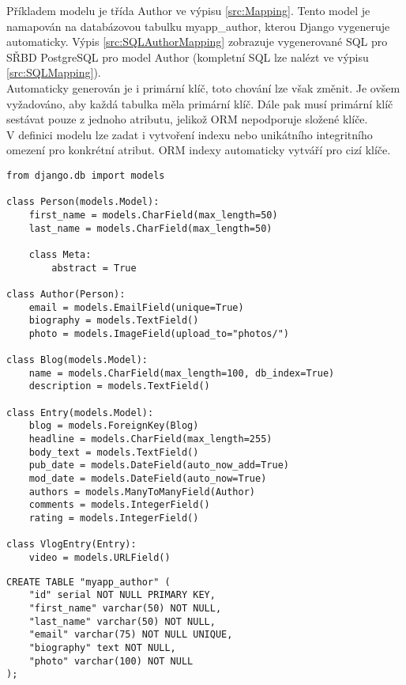 \documentclass[ing,male,java,dept456]{diploma}						%
\begin{document}
Příkladem modelu je třída Author ve výpisu \ref{src:Mapping}. Tento model je namapován na databázovou tabulku myapp\_author, kterou Django vygeneruje automaticky. Výpis \ref{src:SQLAuthorMapping} zobrazuje vygenerované SQL pro SŘBD PostgreSQL pro model Author (kompletní SQL lze nalézt ve výpisu \ref{src:SQLMapping}). \\
Automaticky generován je i primární klíč, toto chování lze však změnit. Je ovšem vyžadováno, aby každá tabulka měla primární klíč. Dále pak musí primární klíč sestávat pouze z jednoho atributu, jelikož ORM nepodporuje složené klíče. \\
V definici modelu lze zadat i vytvoření indexu nebo unikátního integritního omezení pro konkrétní atribut. ORM indexy automaticky vytváří pro cizí klíče. \\

\begin{lstlisting}[style=custompython, emph={ Blog, Person, Author, Entry, VlogEntry}, emphstyle={\bfseries}, label=src:Mapping, caption=Modely jednoduché aplikace pro vytváření blogů]
from django.db import models

class Person(models.Model):
    first_name = models.CharField(max_length=50)
    last_name = models.CharField(max_length=50)

    class Meta:
        abstract = True

class Author(Person):
    email = models.EmailField(unique=True)
    biography = models.TextField()
    photo = models.ImageField(upload_to="photos/")

class Blog(models.Model):
    name = models.CharField(max_length=100, db_index=True)
    description = models.TextField()

class Entry(models.Model):
    blog = models.ForeignKey(Blog)
    headline = models.CharField(max_length=255)
    body_text = models.TextField()
    pub_date = models.DateField(auto_now_add=True)
    mod_date = models.DateField(auto_now=True)
    authors = models.ManyToManyField(Author)
    comments = models.IntegerField()
    rating = models.IntegerField()

class VlogEntry(Entry):
    video = models.URLField()

\end{lstlisting}

\begin{lstlisting}[label=src:SQLAuthorMapping, caption=Reprezentace modelu Author v PostgreSQL, style=customsql]
CREATE TABLE "myapp_author" (
    "id" serial NOT NULL PRIMARY KEY,
    "first_name" varchar(50) NOT NULL,
    "last_name" varchar(50) NOT NULL,
    "email" varchar(75) NOT NULL UNIQUE,
    "biography" text NOT NULL,
    "photo" varchar(100) NOT NULL
);
\end{lstlisting}
\end{document}
